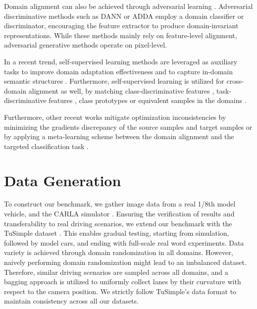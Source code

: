 \documentclass{article}
\begin{document}
	Domain alignment can also be achieved through adversarial learning \cite{Goodfellow2014}. Adversarial discriminative methods such as DANN \cite{Ganin2016} or ADDA \cite{Tzeng2017ADDA} employ a domain classifier or discriminator, encouraging the feature extractor to produce domain-invariant representations. While these methods mainly rely on feature-level alignment, adversarial generative methods \cite{Hoffman_cycada2017, Bousmalis_pixelDA} operate on pixel-level. 
	
	In a recent trend, self-supervised learning methods are leveraged as auxiliary tasks to improve domain adaptation effectiveness and to capture in-domain semantic structures \cite{Xu2019, Sun2019SSL, Kim2020CDS, yue2021prototypical, xie2020self}. Furthermore, self-supervised learning is utilized for cross-domain alignment as well, by matching class-discriminative features \cite{Kim2020CDS, wang2020classes}, task-discriminative features \cite{wei2021toalign}, class prototypes \cite{tanwisuth2021prototype, yue2021prototypical} or equivalent samples in the domains \cite{zhao2021reducing}.
	
	Furthermore, other recent works mitigate optimization inconsistencies by minimizing the gradients discrepancy of the source samples and target samples \cite{du2021cross} or by applying a meta-learning scheme between the domain alignment and the targeted classification task \cite{wei2021metaalign}.
	
	\section{Data Generation}
	To construct our benchmark, we gather image data from a real 1/8th model vehicle, and the CARLA simulator \cite{Carla2017}. Ensuring the verification of results and transferability to real driving scenarios, we extend our benchmark with the TuSimple dataset \cite{TuSimple2017}. This enables gradual testing, starting from simulation, followed by model cars, and ending with full-scale real word experiments. Data variety is achieved through domain randomization in all domains. However, naively performing domain randomization might lead to an imbalanced dataset. Therefore, similar driving scenarios are sampled across all domains, and a bagging approach is utilized to uniformly collect lanes by their curvature with respect to the camera position. We strictly follow TuSimple's data format \cite{TuSimple2017} to maintain consistency across all our datasets. 
	
\end{document}
